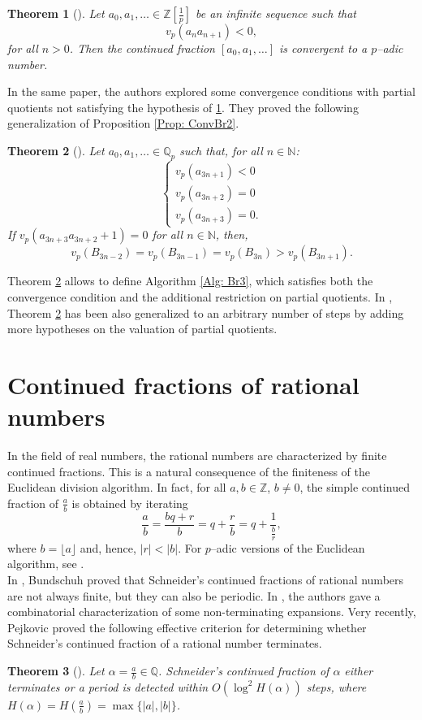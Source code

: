 \documentclass[12pt, reqno]{amsart}
\theoremstyle{plain}
\newtheorem{Theorem}{Theorem}
\theoremstyle{definition}
\begin{document}
\begin{Theorem}[\cite{MRSII}]\label{Thm: ConvCond}
Let  $a_0,a_1,\ldots\in \mathbb{Z}\left[\frac{1}{p}\right]$ be an infinite sequence such that
\[v_p(a_{n}a_{n+1})<0,\]
for all $n > 0$.
Then the continued fraction $[a_0,a_1,\ldots]$ is convergent to a $p$--adic number.
\end{Theorem}

In the same paper, the authors explored some convergence conditions with partial quotients not satisfying the hypothesis of \ref{Thm: ConvCond}. They proved the following generalization of Proposition \ref{Prop: ConvBr2}.

\begin{Theorem}[\cite{MRSII}]\label{Thm: ConvBr3}
Let $a_0,a_1,\ldots \in \mathbb{Q}_p$ such that, for all $n\in\mathbb{N}$:
\[\begin{cases}
v_p(a_{3n+1})<0\\
v_p(a_{3n+2})=0\\
v_p(a_{3n+3})=0.
\end{cases}\]
If $v_p(a_{3n+3}a_{3n+2}+1)=0$ for all $n \in \mathbb{N}$, then, 
\[v_p(B_{3n-2})=v_p(B_{3n-1})=v_p(B_{3n})>v_p(B_{3n+1}).\]
\end{Theorem}

Theorem \ref{Thm: ConvBr3} allows to define Algorithm \eqref{Alg: Br3}, which satisfies both the convergence condition and the additional restriction on partial quotients. In \cite{MRSII}, Theorem \ref{Thm: ConvBr3} has been also generalized to an arbitrary number of steps by adding more hypotheses on the valuation of partial quotients.

\section{Continued fractions of rational numbers}\label{Sec: ratio}
In the field of real numbers, the rational numbers are characterized by finite continued fractions. This is a natural consequence of the finiteness of the Euclidean division algorithm. In fact, for all $a,b\in\mathbb{Z}$, $b\neq 0$, the simple continued fraction of $\frac{a}{b}$ is obtained by iterating
\begin{equation}
 \frac{a}{b}=\frac{bq+r}{b}=q+\frac{r}{b}=q+\frac{1}{\frac{b}{r}},  
\end{equation}
where $b=\lfloor a\rfloor$ and, hence, $|r|<|b|$. For $p$--adic versions of the Euclidean algorithm, see \cite{Err,Lager}.\\

In \cite{BUN}, Bundschuh proved that Schneider's continued fractions of rational numbers are not always finite, but they can also be periodic. In \cite{HW}, the authors gave a combinatorial characterization of some non-terminating expansions. Very recently, Pejkovic \cite{PEJ} proved the following effective criterion for determining whether Schneider's continued fraction of a rational number terminates.
\begin{Theorem}[\cite{PEJ}]
Let $\alpha=\frac{a}{b}\in\mathbb{Q}$. Schneider's continued fraction of $\alpha$ either terminates or a period is detected within $O(\log ^2 H(\alpha))$ steps, where $H(\alpha)=H(\frac{a}{b})=\max\{|a|,|b| \}$.
\end{Theorem}
\end{document}
